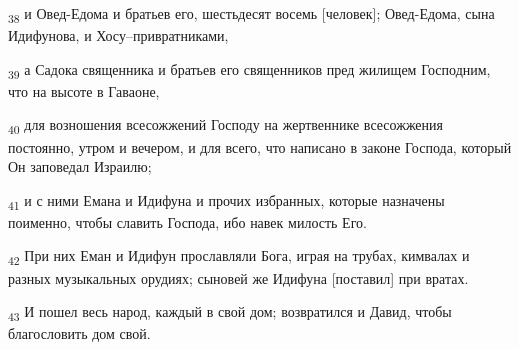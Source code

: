 \begin{tcolorbox}
\textsubscript{38} и Овед-Едома и братьев его, шестьдесят восемь [человек]; Овед-Едома, сына Идифунова, и Хосу--привратниками,
\end{tcolorbox}
\begin{tcolorbox}
\textsubscript{39} а Садока священника и братьев его священников пред жилищем Господним, что на высоте в Гаваоне,
\end{tcolorbox}
\begin{tcolorbox}
\textsubscript{40} для возношения всесожжений Господу на жертвеннике всесожжения постоянно, утром и вечером, и для всего, что написано в законе Господа, который Он заповедал Израилю;
\end{tcolorbox}
\begin{tcolorbox}
\textsubscript{41} и с ними Емана и Идифуна и прочих избранных, которые назначены поименно, чтобы славить Господа, ибо навек милость Его.
\end{tcolorbox}
\begin{tcolorbox}
\textsubscript{42} При них Еман и Идифун прославляли Бога, играя на трубах, кимвалах и разных музыкальных орудиях; сыновей же Идифуна [поставил] при вратах.
\end{tcolorbox}
\begin{tcolorbox}
\textsubscript{43} И пошел весь народ, каждый в свой дом; возвратился и Давид, чтобы благословить дом свой.
\end{tcolorbox}
